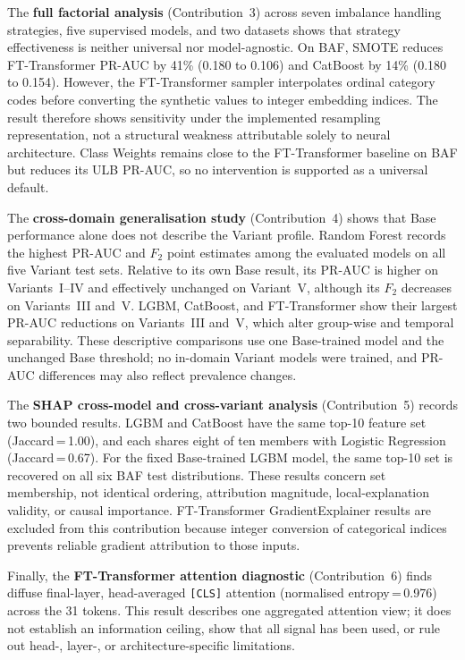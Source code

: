 The \textbf{full factorial analysis} (Contribution~3) across seven imbalance handling strategies, five supervised models, and two datasets shows that strategy effectiveness is neither universal nor model-agnostic. On BAF, SMOTE reduces FT-Transformer PR-AUC by 41\% (0.180 to 0.106) and CatBoost by 14\% (0.180 to 0.154). However, the FT-Transformer sampler interpolates ordinal category codes before converting the synthetic values to integer embedding indices. The result therefore shows sensitivity under the implemented resampling representation, not a structural weakness attributable solely to neural architecture. Class Weights remains close to the FT-Transformer baseline on BAF but reduces its ULB PR-AUC, so no intervention is supported as a universal default.

The \textbf{cross-domain generalisation study} (Contribution~4) shows that Base performance alone does not describe the Variant profile. Random Forest records the highest PR-AUC and $F_2$ point estimates among the evaluated models on all five Variant test sets. Relative to its own Base result, its PR-AUC is higher on Variants~I--IV and effectively unchanged on Variant~V, although its $F_2$ decreases on Variants~III and~V. LGBM, CatBoost, and FT-Transformer show their largest PR-AUC reductions on Variants~III and~V, which alter group-wise and temporal separability. These descriptive comparisons use one Base-trained model and the unchanged Base threshold; no in-domain Variant models were trained, and PR-AUC differences may also reflect prevalence changes.

The \textbf{SHAP cross-model and cross-variant analysis} (Contribution~5) records two bounded results. LGBM and CatBoost have the same top-10 feature set (Jaccard\,=\,1.00), and each shares eight of ten members with Logistic Regression (Jaccard\,=\,0.67). For the fixed Base-trained LGBM model, the same top-10 set is recovered on all six BAF test distributions. These results concern set membership, not identical ordering, attribution magnitude, local-explanation validity, or causal importance. FT-Transformer GradientExplainer results are excluded from this contribution because integer conversion of categorical indices prevents reliable gradient attribution to those inputs.

Finally, the \textbf{FT-Transformer attention diagnostic} (Contribution~6) finds diffuse final-layer, head-averaged \texttt{[CLS]} attention (normalised entropy\,=\,0.976) across the 31 tokens. This result describes one aggregated attention view; it does not establish an information ceiling, show that all signal has been used, or rule out head-, layer-, or architecture-specific limitations.

